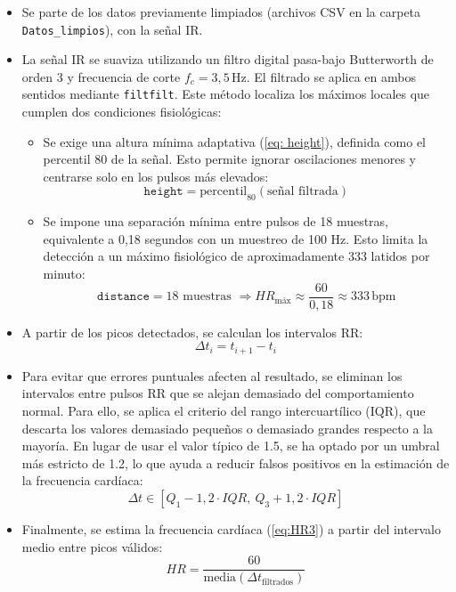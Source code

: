 \begin{itemize}
    \item Se parte de los datos previamente limpiados (archivos CSV en la carpeta \texttt{Datos\_limpios}), con la señal IR.
    \item La señal IR se suaviza utilizando un filtro digital pasa-bajo Butterworth de orden 3 y frecuencia de corte \( f_c = 3{,}5\,\text{Hz} \). El filtrado se aplica en ambos sentidos mediante \texttt{filtfilt}. Este método localiza los máximos locales que cumplen dos condiciones fisiológicas:
\begin{itemize}
    \item Se exige una altura mínima adaptativa (\ref{eq: height}), definida como el percentil 80 de la señal. Esto permite ignorar oscilaciones menores y centrarse solo en los pulsos más elevados:
    \begin{equation}
    \texttt{height} = \text{percentil}_{80}(\text{señal filtrada})
    \label{eq: height}
    \end{equation}
    \item Se impone una separación mínima entre pulsos de 18 muestras, equivalente a 0,18 segundos con un muestreo de 100 Hz. Esto limita la detección a un máximo fisiológico de aproximadamente 333 latidos por minuto:
    \begin{equation}
    \texttt{distance} = 18 \text{ muestras } \Rightarrow HR_{\text{máx}} \approx \frac{60}{0{,}18} \approx 333\,\text{bpm}
    \end{equation}
\end{itemize}
    \item A partir de los picos detectados, se calculan los intervalos RR:
    \begin{equation}
    \Delta t_i = t_{i+1} - t_i
    \end{equation}
    \item Para evitar que errores puntuales afecten al resultado, se eliminan los intervalos entre pulsos RR que se alejan demasiado del comportamiento normal. Para ello, se aplica el criterio del rango intercuartílico (IQR), que descarta los valores demasiado pequeños o demasiado grandes respecto a la mayoría. En lugar de usar el valor típico de 1.5, se ha optado por un umbral más estricto de 1.2, lo que ayuda a reducir falsos positivos en la estimación de la frecuencia cardíaca:
    \begin{equation}
    \Delta t \in [Q_1 - 1{,}2 \cdot IQR,\ Q_3 + 1{,}2 \cdot IQR]
    \end{equation}
    \item Finalmente, se estima la frecuencia cardíaca (\ref{eq:HR3}) a partir del intervalo medio entre picos válidos:
    \begin{equation}
    HR = \frac{60}{\text{media}(\Delta t_{\text{filtrados}})}
    \label{eq:HR3}
    \end{equation}
\end{itemize}

